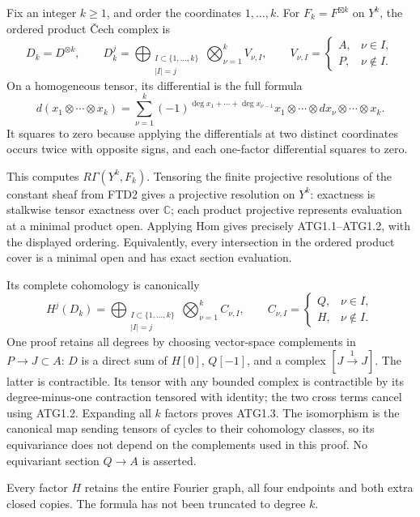 Fix an integer \(k\ge1\), and order the coordinates \(1,\ldots,k\). For
\(F_k=F^{\boxtimes k}\) on \(Y^k\), the ordered product Čech complex is
\[
D_k=D^{\otimes k},\qquad
D_k^j=\bigoplus_{\substack{I\subset\{1,\ldots,k\}\\|I|=j}}
\bigotimes_{\nu=1}^k V_{\nu,I},\qquad
V_{\nu,I}=\begin{cases}A,&\nu\in I,\\P,&\nu\notin I.\end{cases}
\tag{ATG1.1}
\] On a homogeneous tensor, its differential is the full formula \[
d(x_1\otimes\cdots\otimes x_k)
=\sum_{\nu=1}^k(-1)^{\deg x_1+\cdots+\deg x_{\nu-1}}
x_1\otimes\cdots\otimes dx_\nu\otimes\cdots\otimes x_k.
\tag{ATG1.2}
\] It squares to zero because applying the differentials at two distinct
coordinates occurs twice with opposite signs, and each one-factor
differential squares to zero.

This computes \(R\Gamma(Y^k,F_k)\). Tensoring the finite projective
resolutions of the constant sheaf from FTD2 gives a projective
resolution on \(Y^k\): exactness is stalkwise tensor exactness over
\(\mathbb C\); each product projective represents evaluation at a
minimal product open. Applying Hom gives precisely ATG1.1--ATG1.2, with
the displayed ordering. Equivalently, every intersection in the ordered
product cover is a minimal open and has exact section evaluation.

Its complete cohomology is canonically \[
\boxed{
H^j(D_k)=
\bigoplus_{\substack{I\subset\{1,\ldots,k\}\\|I|=j}}
\bigotimes_{\nu=1}^k C_{\nu,I},\qquad
C_{\nu,I}=\begin{cases}Q,&\nu\in I,\\H,&\nu\notin I.\end{cases}}
\tag{ATG1.3}
\] One proof retains all degrees by choosing vector-space complements in
\(P\to J\subset A\): \(D\) is a direct sum of \(H[0]\), \(Q[-1]\), and a
complex \([J\xrightarrow1J]\). The latter is contractible. Its tensor
with any bounded complex is contractible by its degree-minus-one
contraction tensored with identity; the two cross terms cancel using
ATG1.2. Expanding all \(k\) factors proves ATG1.3. The isomorphism is
the canonical map sending tensors of cycles to their cohomology classes,
so its equivariance does not depend on the complements used in this
proof. No equivariant section \(Q\to A\) is asserted.

Every factor \(H\) retains the entire Fourier graph, all four endpoints
and both extra closed copies. The formula has not been truncated to
degree \(k\).

